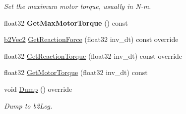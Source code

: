 \begin{DoxyCompactItemize}
\begin{DoxyCompactList}\small\item\em Set the maximum motor torque, usually in N-\/m. \end{DoxyCompactList}\item 
\mbox{\label{classb2RevoluteJoint_a878308eb3e299e15ac9dc88d48671d51}} 
float32 {\bfseries Get\+Max\+Motor\+Torque} () const
\item 
\hyperlink{structb2Vec2}{b2\+Vec2} \hyperlink{classb2RevoluteJoint_abeb7bf941589aed0d7f330a578a62024}{Get\+Reaction\+Force} (float32 inv\+\_\+dt) const override
\item 
float32 \hyperlink{classb2RevoluteJoint_aab61a3f330aa93ae28f657e36bc3db51}{Get\+Reaction\+Torque} (float32 inv\+\_\+dt) const override
\item 
float32 \hyperlink{classb2RevoluteJoint_a5abafb4d0c1df642f73a5d9faf615e26}{Get\+Motor\+Torque} (float32 inv\+\_\+dt) const
\item 
\mbox{\label{classb2RevoluteJoint_a408badabe21b169412a5c4a2f36bbbd8}} 
void \hyperlink{classb2RevoluteJoint_a408badabe21b169412a5c4a2f36bbbd8}{Dump} () override
\begin{DoxyCompactList}\small\item\em Dump to b2\+Log. \end{DoxyCompactList}\end{DoxyCompactItemize}
